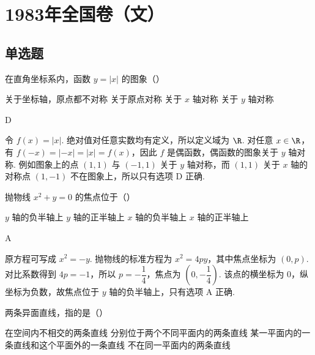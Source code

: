 \chapter{1983年全国卷（文）}

\section{单选题}

\begin{problem}
在直角坐标系内，函数 \( y = |x| \) 的图象（\quad）

\choices
    {关于坐标轴，原点都不对称}
    {关于原点对称}
    {关于 \(x\) 轴对称}
    {关于 \(y\) 轴对称}
\end{problem}

\begin{answer}
D
\end{answer}

\begin{solution}
令 \(f(x)=|x|\). 绝对值对任意实数均有定义，所以定义域为 \(\R\). 对任意 \(x\in\R\)，有 \(f(-x)=|-x|=|x|=f(x)\)，因此 \(f\) 是偶函数，偶函数的图象关于 \(y\) 轴对称. 例如图象上的点 \((1,1)\) 与 \((-1,1)\) 关于 \(y\) 轴对称，而 \((1,1)\) 关于 \(x\) 轴的对称点 \((1,-1)\) 不在图象上，所以只有选项 D 正确.
\end{solution}

\begin{problem}
抛物线 \(x^{2} + y = 0\) 的焦点位于（\quad）

\choices
    {\(y\) 轴的负半轴上}
    {\(y\) 轴的正半轴上}
    {\(x\) 轴的负半轴上}
    {\(x\) 轴的正半轴上}
\end{problem}

\begin{answer}
A
\end{answer}

\begin{solution}
原方程可写成 \(x^2=-y\). 抛物线的标准方程为 \(x^2=4py\)，其中焦点坐标为 \((0,p)\). 对比系数得到 \(4p=-1\)，所以 \(p=-\dfrac14\)，焦点为 \(\left(0,-\dfrac14\right)\). 该点的横坐标为 \(0\)，纵坐标为负数，故焦点位于 \(y\) 轴的负半轴上，只有选项 A 正确.
\end{solution}

\begin{problem}
两条异面直线，指的是（\quad）

\choices
    {在空间内不相交的两条直线}
    {分别位于两个不同平面内的两条直线}
    {某一平面内的一条直线和这个平面外的一条直线}
    {不在同一平面内的两条直线}
\end{problem}

